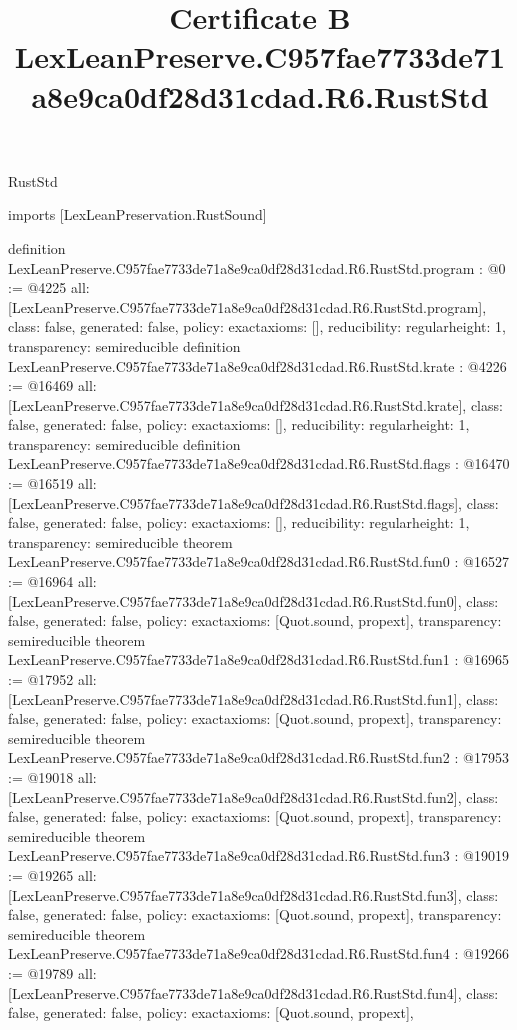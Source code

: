 \begin{lexlean}{RustStd}
\title{Certificate B LexLeanPreserve.C957fae7733de71a8e9ca0df28d31cdad.R6.RustStd}
\begin{coremodule}
imports [LexLeanPreservation.RustSound]

definition LexLeanPreserve.C957fae7733de71a8e9ca0df28d31cdad.R6.RustStd.program : @0 := @4225 {
  all: [LexLeanPreserve.C957fae7733de71a8e9ca0df28d31cdad.R6.RustStd.program],
  class: false,
  generated: false,
  policy: exact{axioms: []},
  reducibility: regular{height: 1},
  transparency: semireducible
}
definition LexLeanPreserve.C957fae7733de71a8e9ca0df28d31cdad.R6.RustStd.krate : @4226 := @16469 {
  all: [LexLeanPreserve.C957fae7733de71a8e9ca0df28d31cdad.R6.RustStd.krate],
  class: false,
  generated: false,
  policy: exact{axioms: []},
  reducibility: regular{height: 1},
  transparency: semireducible
}
definition LexLeanPreserve.C957fae7733de71a8e9ca0df28d31cdad.R6.RustStd.flags : @16470 := @16519 {
  all: [LexLeanPreserve.C957fae7733de71a8e9ca0df28d31cdad.R6.RustStd.flags],
  class: false,
  generated: false,
  policy: exact{axioms: []},
  reducibility: regular{height: 1},
  transparency: semireducible
}
theorem LexLeanPreserve.C957fae7733de71a8e9ca0df28d31cdad.R6.RustStd.fun0 : @16527 := @16964 {
  all: [LexLeanPreserve.C957fae7733de71a8e9ca0df28d31cdad.R6.RustStd.fun0],
  class: false,
  generated: false,
  policy: exact{axioms: [Quot.sound, propext]},
  transparency: semireducible
}
theorem LexLeanPreserve.C957fae7733de71a8e9ca0df28d31cdad.R6.RustStd.fun1 : @16965 := @17952 {
  all: [LexLeanPreserve.C957fae7733de71a8e9ca0df28d31cdad.R6.RustStd.fun1],
  class: false,
  generated: false,
  policy: exact{axioms: [Quot.sound, propext]},
  transparency: semireducible
}
theorem LexLeanPreserve.C957fae7733de71a8e9ca0df28d31cdad.R6.RustStd.fun2 : @17953 := @19018 {
  all: [LexLeanPreserve.C957fae7733de71a8e9ca0df28d31cdad.R6.RustStd.fun2],
  class: false,
  generated: false,
  policy: exact{axioms: [Quot.sound, propext]},
  transparency: semireducible
}
theorem LexLeanPreserve.C957fae7733de71a8e9ca0df28d31cdad.R6.RustStd.fun3 : @19019 := @19265 {
  all: [LexLeanPreserve.C957fae7733de71a8e9ca0df28d31cdad.R6.RustStd.fun3],
  class: false,
  generated: false,
  policy: exact{axioms: [Quot.sound, propext]},
  transparency: semireducible
}
theorem LexLeanPreserve.C957fae7733de71a8e9ca0df28d31cdad.R6.RustStd.fun4 : @19266 := @19789 {
  all: [LexLeanPreserve.C957fae7733de71a8e9ca0df28d31cdad.R6.RustStd.fun4],
  class: false,
  generated: false,
  policy: exact{axioms: [Quot.sound, propext]},
}
\end{coremodule}
\end{lexlean}
